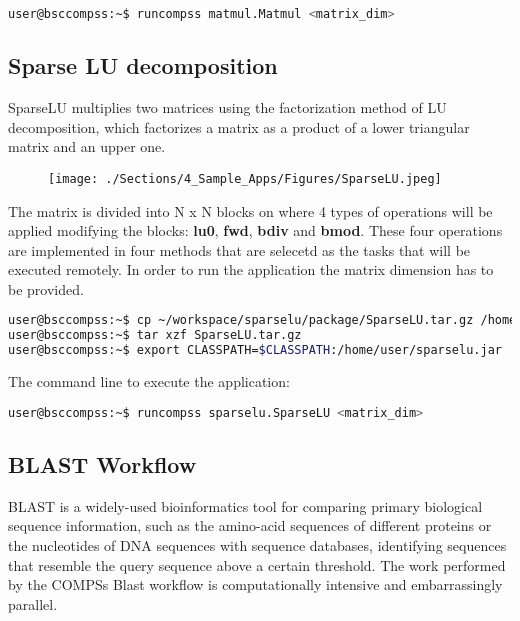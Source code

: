 \begin{lstlisting}[language=bash]
user@bsccompss:~$ runcompss matmul.Matmul <matrix_dim>
\end{lstlisting}


\subsection{Sparse LU decomposition}
SparseLU multiplies two matrices using the factorization method of LU decomposition, which factorizes a 
matrix as a product of a lower triangular matrix and an upper one.

\begin{figure}[ht!]
  \centering
    \texttt{[image: ./Sections/4\_Sample\_Apps/Figures/SparseLU.jpeg]}
\end{figure}

The matrix is divided into N x N blocks on where 4 types of operations will be applied modifying the blocks: 
{\bf lu0}, {\bf fwd}, {\bf bdiv} and {\bf bmod}. These four operations are implemented in four methods that 
are selecetd as the tasks that will be executed remotely. In order to run the application the matrix dimension 
has to be provided.

\begin{lstlisting}[language=bash]
user@bsccompss:~$ cp ~/workspace/sparselu/package/SparseLU.tar.gz /home/user/
user@bsccompss:~$ tar xzf SparseLU.tar.gz
user@bsccompss:~$ export CLASSPATH=$CLASSPATH:/home/user/sparselu.jar
\end{lstlisting}

The command line to execute the application:

\begin{lstlisting}[language=bash]
user@bsccompss:~$ runcompss sparselu.SparseLU <matrix_dim>
\end{lstlisting}

\subsection{BLAST Workflow}
BLAST is a widely-used bioinformatics tool for comparing primary biological sequence information, such as 
the amino-acid sequences of different proteins or the nucleotides of DNA sequences with sequence databases, 
identifying sequences that resemble the query sequence above a certain threshold. 
The work performed by the COMPSs Blast workflow is computationally intensive and embarrassingly parallel.


